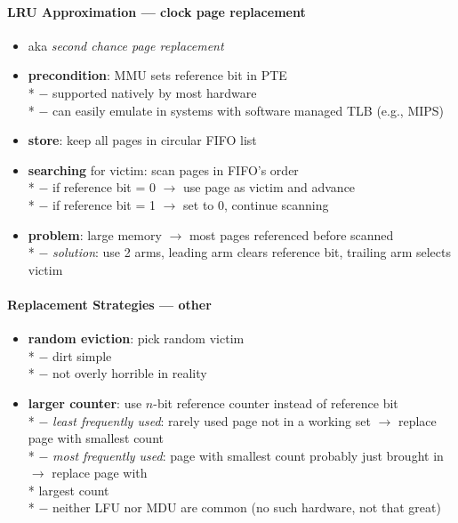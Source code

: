 \paragraph{LRU Approximation --- clock page replacement}
\begin{itemize}
  \item aka \emph{second chance page replacement}
  \item \textbf{precondition}: MMU sets reference bit in PTE \\*
    $ - $ supported natively by most hardware \\*
    $ - $ can easily emulate in systems with software managed TLB (e.g., MIPS)
  \item \textbf{store}: keep all pages in circular FIFO list
  \item \textbf{searching} for victim: scan pages in FIFO's order \\*
    $ - $ if reference bit = 0 $ \to $ use page as victim and advance \\*
    $ - $ if reference bit = 1 $ \to $ set to 0, continue scanning
  \item \textbf{problem}: large memory $ \to $ most pages referenced before scanned \\*
    $ - $ \emph{solution}: use 2 arms, leading arm clears reference bit, trailing arm selects victim
\end{itemize}

\paragraph{Replacement Strategies --- other}
\begin{itemize}
  \item \textbf{random eviction}: pick random victim \\*
    $ - $ dirt simple \\*
    $ - $ not overly horrible in reality
  \item \textbf{larger counter}: use $ n $-bit reference counter instead of reference bit \\*
    $ - $ \emph{least frequently used}: rarely used page not in a working set $ \to $ replace page with smallest count \\*
    $ - $ \emph{most frequently used}: page with smallest count probably just brought in $ \to $ replace page with \\* \phantom{$ - $} \phantom{$ \cdot $} largest count \\*
    $ - $ neither LFU nor MDU are common (no such hardware, not that great)
\end{itemize}

